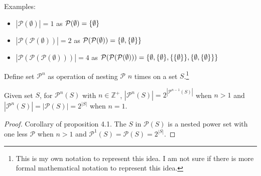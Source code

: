 Examples:
\begin{itemize}
    \item \(|\mathcal{P}(\emptyset)|=1\) as \(\mathcal{P}(\emptyset)=\{\emptyset\}\)
    \item \(|\mathcal{P}(\mathcal{P}(\emptyset))|=2\) as \(\mathcal{P}(\mathcal{P}(\emptyset))=\{\emptyset,\{\emptyset\}\}\)
    \item \(|\mathcal{P}(\mathcal{P}(\mathcal{P}(\emptyset)))|=4\) as \(\mathcal{P}(\mathcal{P}(\mathcal{P}(\emptyset)))=\{\emptyset,\{\emptyset\},\{\{\emptyset\}\},\{\emptyset,\{\emptyset\}\}\}\)
\end{itemize}

\bigskip

Define set \(\mathcal{P}^n\) as operation of nesting \(\mathcal{P}\) \(n\) times on a set \(S\).\footnote{This is my own notation to represent this idea. I am not sure if there is more formal mathematical notation
to represent this idea.}
\begin{proposition} 
    Given set \(S\), for \(\mathcal{P}^n(S)\) with \(n\in\mathbb{Z}^+\), \(|\mathcal{P}^n(S)|=2^{|\mathcal{P}^{n-1}(S)|}\) when \(n>1\) and \(|\mathcal{P}^n(S)|=|\mathcal{P}(S)|=2^{|S|}\) when \(n=1\).
\end{proposition}
\begin{proof}
    Corollary of proposition 4.1. The \(S\) in \(\mathcal{P}(S)\) is a nested power set with one less \(\mathcal{P}\) when \(n>1\) and \(\mathcal{P}^1(S)=\mathcal{P}(S)=2^{|S|}\).
\end{proof}

